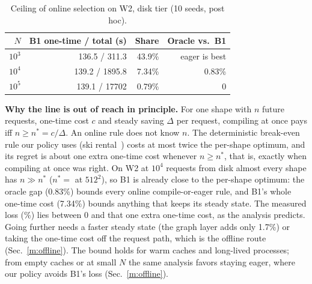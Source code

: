\documentclass[conference]{IEEEtran}
\newcommand{\tn}[1]{#1}%
\begin{document}
\begin{table}[t]
\caption{Ceiling of online selection on W2, disk tier (10 seeds, post hoc).}
\label{m:tab:ceiling}
\centering\footnotesize
\setlength{\tabcolsep}{3pt}
\begin{tabular}{rrrr}
\toprule
$N$ & B1 one-time / total (s) & Share & Oracle vs.\ B1\\
\midrule
$10^3$ & 136.5 / 311.3 & 43.9\% & eager is best\\
$10^4$ & 139.2 / 1895.8 & 7.34\% & 0.83\%\\
$10^5$ & 139.1 / 17702 & 0.79\% & 0\\
\bottomrule
\end{tabular}
\end{table}

\textbf{Why the line is out of reach in principle.} For one shape with $n$ future requests, one-time cost $c$ and steady saving $\Delta$ per request, compiling at once pays iff $n\ge n^{*}{=}c/\Delta$. An online rule does not know $n$. The deterministic break-even rule our policy uses (ski rental~\cite{karlin1988}) costs at most twice the per-shape optimum, and its regret is about one extra one-time cost whenever $n\ge n^{*}$, that is, exactly when compiling at once was right. On W2 at $10^4$ requests from disk almost every shape has $n\gg n^{*}$ ($n^{*}{=}$\NBreakCompileDiskFiveTwelve{} at $512^2$), so B1 is already close to the per-shape optimum: the oracle gap (\tn{0.83\%}) bounds every online compile-or-eager rule, and B1's whole one-time cost (\tn{7.34\%}) bounds anything that keeps its steady state. The measured loss (\NHfourAGapPctTenK\%) lies between 0 and that one extra one-time cost, as the analysis predicts. Going further needs a faster steady state (the graph layer adds only \tn{1.7\%}) or taking the one-time cost off the request path, which is the offline route (Sec.~\ref{m:offline}). The bound holds for warm caches and long-lived processes; from empty caches or at small $N$ the same analysis favors staying eager, where our policy avoids B1's loss (Sec.~\ref{m:offline}).
\end{document}
